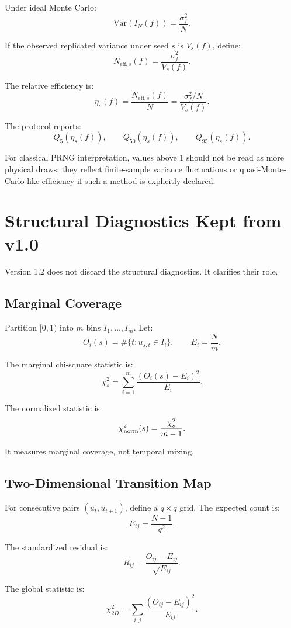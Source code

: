 \documentclass[11pt,a4paper]{article}
\newcommand{\Var}{\mathrm{Var}}
\begin{document}
Under ideal Monte Carlo:
\[
\Var(I_N(f))=\frac{\sigma_f^2}{N}.
\]

If the observed replicated variance under seed \(s\) is \(V_s(f)\), define:
\[
\boxed{
N_{\mathrm{eff},s}(f)
=
\frac{\sigma_f^2}{V_s(f)}.
}
\]

The relative efficiency is:
\[
\boxed{
\eta_s(f)
=
\frac{N_{\mathrm{eff},s}(f)}{N}
=
\frac{\sigma_f^2/N}{V_s(f)}.
}
\]

The protocol reports:
\[
Q_5(\eta_s(f)),
\qquad
Q_{50}(\eta_s(f)),
\qquad
Q_{95}(\eta_s(f)).
\]

For classical PRNG interpretation, values above \(1\) should not be read as more physical draws; they reflect finite-sample variance fluctuations or quasi-Monte-Carlo-like efficiency if such a method is explicitly declared.

\section{Structural Diagnostics Kept from v1.0}

Version 1.2 does not discard the structural diagnostics. It clarifies their role.

\subsection{Marginal Coverage}

Partition \([0,1)\) into \(m\) bins \(I_1,\ldots,I_m\). Let:
\[
O_i(s)=\#\{t:u_{s,t}\in I_i\},
\qquad
E_i=\frac Nm.
\]

The marginal chi-square statistic is:
\[
\chi_s^2
=
\sum_{i=1}^{m}
\frac{(O_i(s)-E_i)^2}{E_i}.
\]

The normalized statistic is:
\[
\chi^2_{\rm norm}(s)
=
\frac{\chi_s^2}{m-1}.
\]

It measures marginal coverage, not temporal mixing.

\subsection{Two-Dimensional Transition Map}

For consecutive pairs \((u_t,u_{t+1})\), define a \(q\times q\) grid. The expected count is:
\[
E_{ij}=\frac{N-1}{q^2}.
\]

The standardized residual is:
\[
R_{ij}
=
\frac{O_{ij}-E_{ij}}{\sqrt{E_{ij}}}.
\]

The global statistic is:
\[
\chi^2_{2D}
=
\sum_{i,j}
\frac{(O_{ij}-E_{ij})^2}{E_{ij}}.
\]
\end{document}
